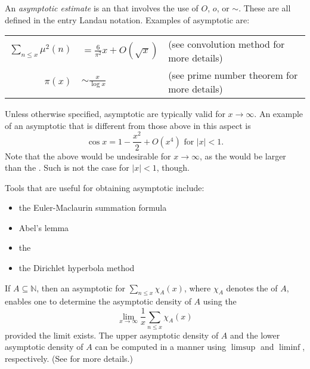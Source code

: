 \documentclass[12pt]{article}
\begin{document}

An \emph{asymptotic estimate} is an  that involves the use of $O$, $o$, or $\sim$.  These are all defined in the entry Landau notation.  Examples of asymptotic  are:

\begin{center}
\begin{tabular}{rll}
$\displaystyle \sum_{n \le x} \mu^2(n)$ & $\displaystyle = \frac{6}{\pi^2}x+O(\sqrt{x})$ & (see convolution method for more details) \\
$\displaystyle \pi(x)$ & $\displaystyle \sim \frac{x}{\log x}$ & (see prime number theorem for more details) \end{tabular}
\end{center}

Unless otherwise specified, asymptotic  are typically valid for $x \to \infty$.  An example of an asymptotic  that is different from those above in this aspect is
\[
\cos x=1-\frac{x^2}{2}+O(x^4) \text{ for } |x|<1.
\]
Note that the above  would be undesirable for $x \to \infty$, as the  would be larger than the .  Such is not the case for $|x|<1$, though.

Tools that are useful for obtaining asymptotic  include:
\begin{itemize}
\item the Euler-Maclaurin summation formula
\item Abel's lemma
\item the 
\item the Dirichlet hyperbola method
\end{itemize}

If $A \subseteq \mathbb{N}$, then an asymptotic  for $\displaystyle \sum_{n \le x} \chi_A(x)$, where $\chi_A$ denotes the  of $A$, enables one to determine the asymptotic density of $A$ using the 
\[
\lim_{x \to \infty} \frac{1}{x} \sum_{n \le x} \chi_A(x)
\]
provided the limit exists.  The upper asymptotic density of $A$ and the lower asymptotic density of $A$ can be computed in a  manner using $\limsup$ and $\liminf$, respectively.  (See  for more details.)
\end{document}
